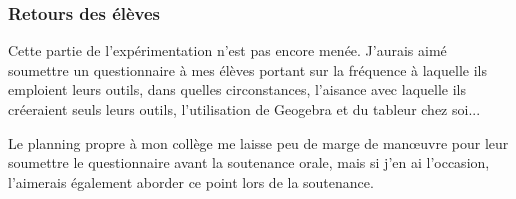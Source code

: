 \subsubsection{Retours des élèves}

Cette partie de l'expérimentation n'est pas encore menée. J'aurais aimé soumettre un questionnaire à mes élèves portant sur la fréquence à laquelle ils emploient leurs outils, dans quelles circonstances, l'aisance avec laquelle ils créeraient seuls leurs outils, l'utilisation de Geogebra et du tableur chez soi...

Le planning propre à mon collège me laisse peu de marge de manœuvre pour leur soumettre le questionnaire avant la soutenance orale, mais si j'en ai l'occasion, l'aimerais également aborder ce point lors de la soutenance.
